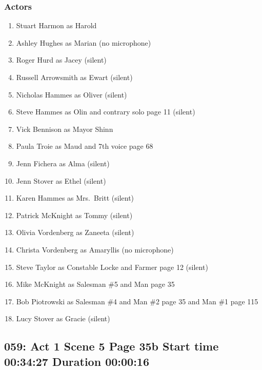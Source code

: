 \subsubsection{Actors}
\begin{enumerate}
\item Stuart Harmon as Harold
\item Ashley Hughes as Marian (no microphone)
\item Roger Hurd as Jacey (silent)
\item Russell Arrowsmith as Ewart (silent)
\item Nicholas Hammes as Oliver (silent)
\item Steve Hammes as Olin and contrary solo page 11 (silent)
\item Vick Bennison as Mayor Shinn
\item Paula Troie as Maud and 7th voice page 68
\item Jenn Fichera as Alma (silent)
\item Jenn Stover as Ethel (silent)
\item Karen Hammes as Mrs.~Britt (silent)
\item Patrick McKnight as Tommy (silent)
\item Olivia Vordenberg as Zaneeta (silent)
\item Christa Vordenberg as Amaryllis (no microphone)
\item Steve Taylor as Constable Locke and Farmer page 12 (silent)
\item Mike McKnight as Salesman \#5 and Man page 35
\item Bob Piotrowski as Salesman \#4 and Man \#2 page 35 and Man \#1 page 115
\item Lucy Stover as Gracie (silent)
\end{enumerate}


\subsection{059: Act 1 Scene 5 Page 35b Start time 00:34:27 Duration 00:00:16}

